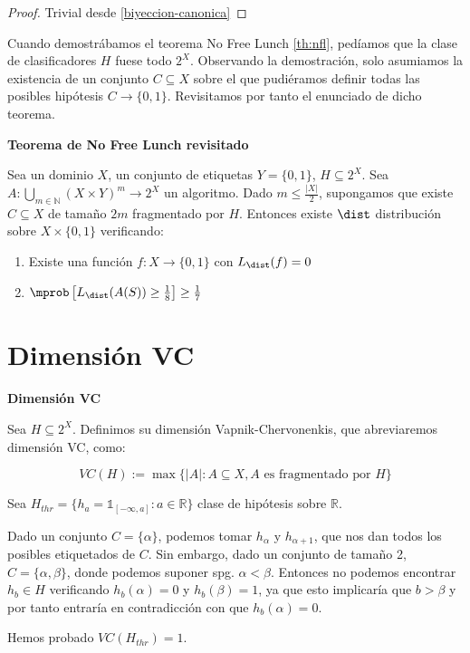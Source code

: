   \begin{proof}
  Trivial desde \ref{biyeccion-canonica}
  \end{proof}


Cuando demostrábamos el teorema No Free Lunch \ref{th:nfl}, pedíamos que la clase de clasificadores $H$ fuese todo $2^X$. 
Observando la demostración, solo asumiamos la existencia de un conjunto $C\subseteq X$ sobre el que pudiéramos definir 
todas las posibles hipótesis $C \rightarrow \{0,1\}$. Revisitamos por tanto el enunciado de dicho teorema.

\begin{theorem}
\textbf{Teorema de No Free Lunch revisitado}

Sea un dominio $X$, un conjunto de etiquetas $Y=\{0,1\}$, $H \subseteq 2^X$.
Sea $A: \underset{m\in \mathbb{N}}{\bigcup} (X\times Y)^m \rightarrow 2^X$ un algoritmo. Dado $m \le \frac{|X|}{2}$,
supongamos que existe $C\subseteq X$ de tamaño $2m$ fragmentado por $H$. Entonces existe $\dist$ distribución sobre 
$X\times \{0,1\}$ verificando:

\begin{enumerate}[i]
\item Existe una función $f: X \rightarrow \{0,1\}$ con $L_{\dist}(f)=0$
\item $\mprob \left[ L_{\dist}(A(S)) \ge \frac{1}{8} \right] \ge \frac{1}{7}$
\end{enumerate}

\label{th:nfl2}
\end{theorem}


\section{Dimensión VC}

\begin{definition}
\textbf{Dimensión VC}

Sea $H \subseteq 2^X$. Definimos su dimensión Vapnik-Chervonenkis, que abreviaremos dimensión VC, como:

\[VC(H) := \max \{|A| : A\subseteq X, A \textrm{ es fragmentado por } H\}\]
\end{definition}


\begin{example}

Sea $H_{thr} = \{h_a = \mathds{1}_{[-\infty, a]}: a\in \mathbb{R}\}$ clase de hipótesis sobre $\mathbb{R}$. 

Dado un conjunto $C=\{\alpha\}$, podemos tomar $h_{\alpha}$ y $h_{\alpha+1}$, que nos dan todos los posibles etiquetados de
$C$. Sin embargo, dado un conjunto de tamaño 2, $C=\{\alpha, \beta\}$, donde podemos suponer spg. $\alpha < \beta$. 
Entonces no podemos encontrar $h_b \in H$ verificando $h_b(\alpha)=0$ y $h_b(\beta) = 1$, ya que esto implicaría que 
$b > \beta$ y por tanto entraría en contradicción con que $h_b(\alpha) = 0$.

Hemos probado $VC(H_{thr}) = 1$.

\end{example}

